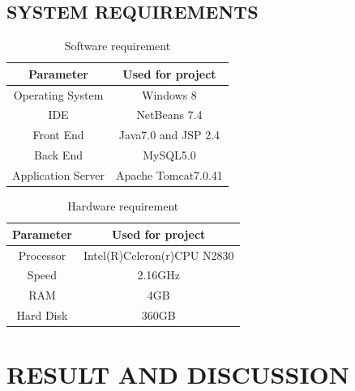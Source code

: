 \section[System Requirements]{\fontsize{14}{12}\selectfont SYSTEM REQUIREMENTS}
\begin{table}[H]
\centering
\caption{Software requirement }
\vspace*{.5cm}
\label{routing}
\begin{tabular}{|c|c|}
\hline
\textbf{Parameter} &\textbf{Used for project}        \\
\hline
Operating System  &Windows 8          \\
      
\hline
IDE &NetBeans 7.4            \\
 \hline
Front End &Java7.0 and JSP 2.4          \\
\hline
Back End &MySQL5.0           \\
 \hline
Application Server &Apache Tomcat7.0.41            \\

\hline
\end{tabular}
\end{table}
\vspace*{1cm}
\vspace*{1cm}
\begin{table}[H]
\centering
\caption{Hardware requirement }
\vspace*{.5cm}
\label{routing}
\begin{tabular}{|c|c|}
\hline
\textbf{Parameter} &\textbf{Used for project}        \\
\hline
Processor &Intel(R)Celeron(r)CPU N2830          \\
      
\hline
Speed&2.16GHz           \\
 \hline
RAM &4GB         \\
Hard Disk &360GB           \\

\hline
\end{tabular}
\end{table}



\chapter[RESULT AND DISCUSSION]{\fontsize{16}{12}\selectfont RESULT AND DISCUSSION}
